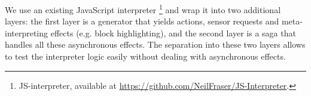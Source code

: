We use an existing JavaScript interpreter%
\footnote{JS-interpreter, available at \url{https://github.com/NeilFraser/JS-Interpreter}.}
and wrap it into two
additional layers: the first layer is a generator
that yields actions, sensor requests and
meta-interpreting effects (e.g. block highlighting), %
and the second layer is a saga
that handles all these asynchronous effects.
The separation into these two layers allows to test the interpreter logic
easily without dealing with asynchronous effects.
